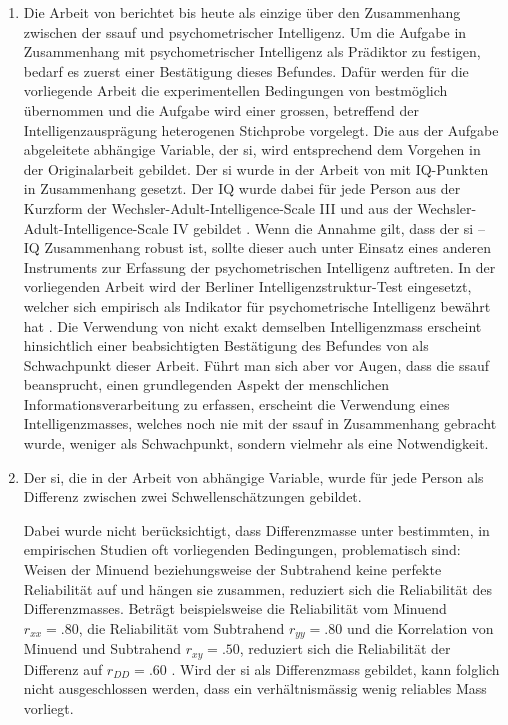 \documentclass[11pt, twoside, a4paper]{book}		%
\begin{document}
\begin{enumerate}
	\item Die Arbeit von \citet{Melnick2013} berichtet bis heute als einzige über den Zusammenhang zwischen der \gls{ssauf} und psychometrischer Intelligenz. Um die Aufgabe in Zusammenhang mit psychometrischer Intelligenz als Prädiktor zu festigen, bedarf es zuerst einer Bestätigung dieses Befundes. Dafür werden für die vorliegende Arbeit die experimentellen Bedingungen von \citeauthor{Melnick2013} bestmöglich übernommen und die Aufgabe wird einer grossen, betreffend der Intelligenzausprägung heterogenen Stichprobe vorgelegt. Die aus der Aufgabe abgeleitete abhängige Variable, der \gls{si}, wird entsprechend dem Vorgehen in der Originalarbeit gebildet. Der \gls{si} wurde in der Arbeit von \citeauthor{Melnick2013} mit IQ-Punkten in Zusammenhang gesetzt. Der IQ wurde dabei für jede Person aus der Kurzform der Wechsler-Adult-Intelligence-Scale III \citep{Axelrod2002} und aus der Wechsler-Adult-In\-tell\-igence-Scale IV \citep{Wechsler2008} gebildet \citep[siehe Studie 1 und 2 bei][]{Melnick2013}. Wenn die Annahme gilt, dass der \gls{si} -- IQ Zusammenhang robust ist, sollte dieser auch unter Einsatz eines anderen Instruments zur Erfassung der psychometrischen Intelligenz auftreten. In der  vorliegenden Arbeit wird der Berliner Intelligenzstruktur-Test \citep{Jaeger1997} eingesetzt, welcher sich empirisch als Indikator für psychometrische Intelligenz bewährt hat \citep{Beauducel2002, Valerius2014}. Die Verwendung von nicht exakt demselben Intelligenzmass erscheint hinsichtlich einer beabsichtigten Bestätigung des Befundes von \citeauthor{Melnick2013} als Schwachpunkt dieser Arbeit. Führt man sich aber vor Augen, dass die \gls{ssauf} beansprucht, einen grundlegenden Aspekt der menschlichen Informationsverarbeitung zu erfassen, erscheint die Verwendung eines Intelligenzmasses, welches noch nie mit der \gls{ssauf} in Zusammenhang gebracht wurde, weniger als Schwachpunkt, sondern vielmehr als eine Notwendigkeit.

	\item Der \gls{si}, die in der Arbeit von \citet{Melnick2013} abhängige Variable, wurde für jede Person als Differenz zwischen zwei Schwellenschätzungen gebildet. 
	
	Dabei wurde nicht berücksichtigt, dass Differenzmasse unter bestimmten, in empirischen Studien oft vorliegenden Bedingungen, problematisch sind: Weisen der Minuend  beziehungsweise der Subtrahend keine perfekte Reliabilität auf und hängen sie zusammen, reduziert sich die Reliabilität des Differenzmasses. Beträgt beispielsweise die Reliabilität vom Minuend $r_{xx} = .80$, die Reliabilität vom Subtrahend $r_{yy} = .80$ und die Korrelation von Minuend und Subtrahend $r_{xy} = .50$, reduziert sich die Reliabilität der Differenz auf $r_{DD} = .60$ \citep[][S. 145]{Murphy2005}. Wird der \gls{si} als Differenzmass gebildet, kann folglich nicht ausgeschlossen werden, dass ein verhältnismässig wenig reliables Mass vorliegt. 
	

\end{enumerate}
\end{document}
